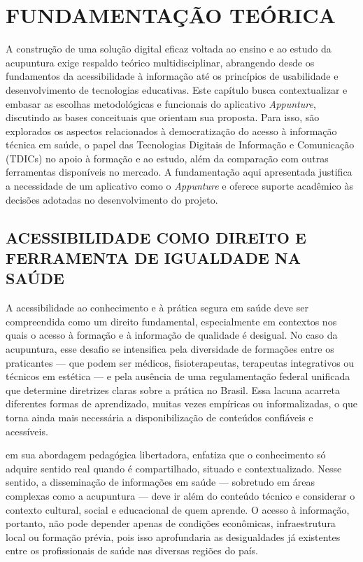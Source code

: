\chapter{FUNDAMENTAÇÃO TEÓRICA} \label{cha:fundamentacao}

A construção de uma solução digital eficaz voltada ao ensino e ao estudo da acupuntura exige respaldo teórico multidisciplinar, abrangendo desde os fundamentos da acessibilidade à informação até os princípios de usabilidade e desenvolvimento de tecnologias educativas. Este capítulo busca contextualizar e embasar as escolhas metodológicas e funcionais do aplicativo \textit{Appunture}, discutindo as bases conceituais que orientam sua proposta. Para isso, são explorados os aspectos relacionados à democratização do acesso à informação técnica em saúde, o papel das Tecnologias Digitais de Informação e Comunicação (TDICs) no apoio à formação e ao estudo, além da comparação com outras ferramentas disponíveis no mercado. A fundamentação aqui apresentada justifica a necessidade de um aplicativo como o \textit{Appunture} e oferece suporte acadêmico às decisões adotadas no desenvolvimento do projeto.

\section{ACESSIBILIDADE COMO DIREITO E FERRAMENTA DE IGUALDADE NA SAÚDE} \label{sec:acessibilidade}

A acessibilidade ao conhecimento e à prática segura em saúde deve ser compreendida como um direito fundamental, especialmente em contextos nos quais o acesso à formação e à informação de qualidade é desigual. No caso da acupuntura, esse desafio se intensifica pela diversidade de formações entre os praticantes --- que podem ser médicos, fisioterapeutas, terapeutas integrativos ou técnicos em estética --- e pela ausência de uma regulamentação federal unificada que determine diretrizes claras sobre a prática no Brasil. Essa lacuna acarreta diferentes formas de aprendizado, muitas vezes empíricas ou informalizadas, o que torna ainda mais necessária a disponibilização de conteúdos confiáveis e acessíveis.

 em sua abordagem pedagógica libertadora, enfatiza que o conhecimento só adquire sentido real quando é compartilhado, situado e contextualizado. Nesse sentido, a disseminação de informações em saúde --- sobretudo em áreas complexas como a acupuntura --- deve ir além do conteúdo técnico e considerar o contexto cultural, social e educacional de quem aprende. O acesso à informação, portanto, não pode depender apenas de condições econômicas, infraestrutura local ou formação prévia, pois isso aprofundaria as desigualdades já existentes entre os profissionais de saúde nas diversas regiões do país.

